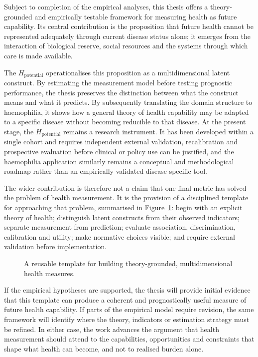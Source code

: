 \noindent Subject to completion of the empirical analyses, this thesis offers a theory-grounded and empirically testable framework for measuring health as future capability. Its central contribution is the proposition that future health cannot be represented adequately through current disease status alone; it emerges from the interaction of biological reserve, social resources and the systems through which care is made available.

The $H_{\text{potential}}$ operationalises this proposition as a multidimensional latent construct. By estimating the measurement model before testing prognostic performance, the thesis preserves the distinction between what the construct means and what it predicts. By subsequently translating the domain structure to haemophilia, it shows how a general theory of health capability may be adapted to a specific disease without becoming reducible to that disease. At the present stage, the $H_{\text{potential}}$ remains a research instrument. It has been developed within a single cohort and requires independent external validation, recalibration and prospective evaluation before clinical or policy use can be justified, and the haemophilia application similarly remains a conceptual and methodological roadmap rather than an empirically validated disease-specific tool.

The wider contribution is therefore not a claim that one final metric has solved the problem of health measurement. It is the provision of a disciplined template for approaching that problem, summarised in Figure~\ref{fig:template}: begin with an explicit theory of health; distinguish latent constructs from their observed indicators; separate measurement from prediction; evaluate association, discrimination, calibration and utility; make normative choices visible; and require external validation before implementation.

\begin{figure}[htbp]
\centering

\captionsetup{justification=justified, width=\linewidth}
\caption{A reusable template for building theory-grounded, multidimensional health measures.}
\label{fig:template}
\end{figure}

If the empirical hypotheses are supported, the thesis will provide initial evidence that this template can produce a coherent and prognostically useful measure of future health capability. If parts of the empirical model require revision, the same framework will identify where the theory, indicators or estimation strategy must be refined. In either case, the work advances the argument that health measurement should attend to the capabilities, opportunities and constraints that shape what health can become, and not to realised burden alone.

